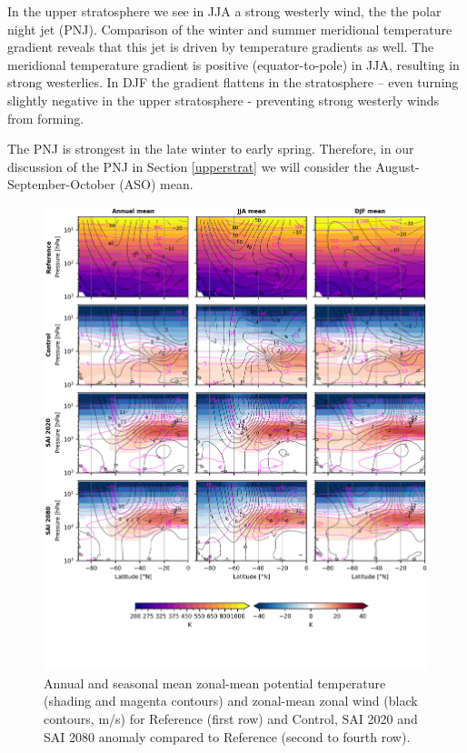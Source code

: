 In the upper stratosphere we see in JJA a strong westerly wind, the the polar night jet (PNJ). Comparison of the winter and summer meridional temperature gradient reveals that this jet is driven by temperature gradients as well. The meridional temperature gradient is positive (equator-to-pole) in JJA, resulting in strong westerlies. In DJF the gradient flattens in the stratosphere – even turning slightly negative in the upper stratosphere - preventing strong westerly winds from forming. 

The PNJ is strongest in the late winter to early spring. Therefore, in our discussion of the PNJ in Section \ref{upperstrat} we will consider the August-September-October (ASO) mean.

\begin{figure}[H]
	\centering
	\includegraphics[width=\linewidth]{images/th_U_zmdiff_full.png}
	\caption{Annual and seasonal mean zonal-mean potential temperature (shading and magenta contours) and zonal-mean zonal wind (black contours, m/s) for Reference (first row) and Control, SAI 2020 and SAI 2080 anomaly compared to Reference (second to fourth row).}
	\label{fig:th_U_zmdiff_full}
\end{figure}

